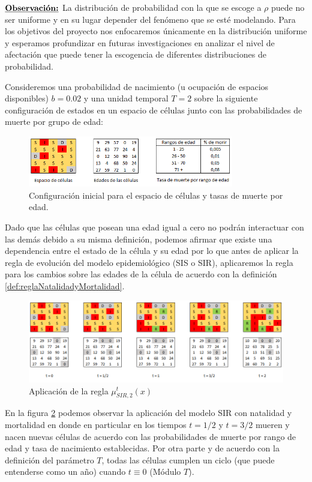 $\textbf{\underline{Observación:}}$ La distribución de probabilidad con la que se escoge a $\rho$ puede no ser uniforme y en su lugar depender del fenómeno que se esté modelando. Para los objetivos del proyecto nos enfocaremos únicamente en la distribución uniforme y esperamos profundizar en futuras investigaciones en analizar el nivel de afectación que puede tener la escogencia de diferentes distribuciones de probabilidad.

\begin{example}\label{ex:natalidadyMortalidad}
Consideremos una probabilidad de nacimiento (u ocupación de espacios disponibles) $b=0.02$ y una unidad temporal $T=2$ sobre la siguiente configuración de estados en un espacio de células junto con las probabilidades de muerte por grupo de edad: 

\begin{figure}[h]
  \centering
    \includegraphics[width=0.8\textwidth]{Imagenes/conInicialMNM.PNG}
    \caption{Configuración inicial para el espacio de células y tasas de muerte por edad.}
    \label{ex:configuraciónInicialNatalidadyMortalidad}
\end{figure}

Dado que las células que posean una edad igual a cero no podrán interactuar con las demás debido a su misma definición, podemos afirmar que existe una dependencia entre el estado de la célula y su edad por lo que antes de aplicar la regla de evolución del modelo epidemiológico (SIS o SIR), aplicaremos la regla para los cambios sobre las edades de la célula de acuerdo con la definición \ref{def:reglaNatalidadyMortalidad}.

\begin{figure}[h]
  \centering
    \includegraphics[width=1\textwidth]{Imagenes/natalidadMortalidad.PNG}
    \caption{Aplicación de la regla $\mu_{SIR,2}^t(x)$}
    \label{ex:aplicaciónReglaNatalidadyMortalidad}
\end{figure}

En la figura \ref{ex:aplicaciónReglaNatalidadyMortalidad} podemos observar la aplicación del modelo SIR con natalidad y mortalidad en donde en particular en los tiempos $t=1/2$ y $t=3/2$ mueren y nacen nuevas células de acuerdo con las probabilidades de muerte por rango de edad y tasa de nacimiento establecidas. Por otra parte y de acuerdo con la definición del parámetro $T$, todas las células cumplen un ciclo (que puede entenderse como un año) cuando $t\equiv0$ (Módulo $T$).
\end{example}

